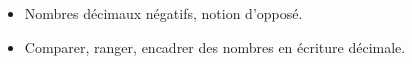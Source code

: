 \begin{prerequis}    
    \begin{itemize}        
        \item[\emoji{red-heart}] Nombres décimaux négatifs, notion d'opposé.
        \columnbreak
        \item[\emoji{diamond-suit}] Comparer, ranger, encadrer des nombres en écriture décimale.
    \end{itemize}
\end{prerequis}